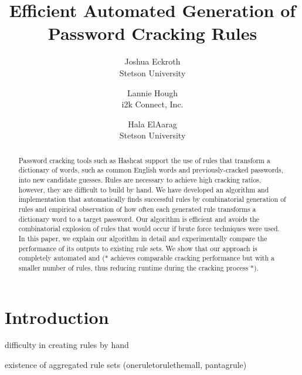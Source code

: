\documentclass[letterpaper,twocolumn,10pt]{article}
\begin{document}
\date{}

\title{\Large \bf Efficient Automated Generation of Password Cracking Rules}

\author{
{\rm Joshua Eckroth}\\
Stetson University
\and
{\rm Lannie Hough}\\
i2k Connect, Inc.
\and
{\rm Hala ElAarag}\\
Stetson University
} %

\maketitle

\begin{abstract}
Password cracking tools such as Hashcat support the use of rules that transform
a dictionary of words, such as common English words and previously-cracked
passwords, into new candidate guesses. Rules are necessary to achieve high
cracking ratios, however, they are difficult to build by hand. We have
developed an algorithm and implementation that automatically finds successful
rules by combinatorial generation of rules and empirical observation of how
often each generated rule transforms a dictionary word to a target password.
Our algorithm is efficient and avoids the combinatorial explosion of rules that
would occur if brute force techniques were used. In this paper, we explain our
algorithm in detail and experimentally compare the performance of its outputs to
existing rule sets. We show that our approach is completely automated and
(* achieves comparable cracking performance but with a smaller number of rules,
thus reducing runtime during the cracking process *).
\end{abstract}


\section{Introduction}

difficulty in creating rules by hand

existence of aggregated rule sets (oneruletorulethemall, pantagrule)
\end{document}
